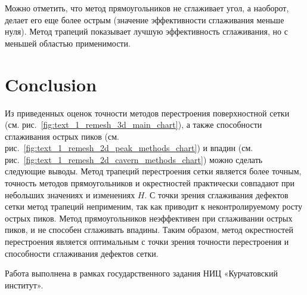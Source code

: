 \documentclass[
11pt,%
tightenlines,%
twoside,%
onecolumn,%
nofloats,%
nobibnotes,%
nofootinbib,%
superscriptaddress,%
noshowpacs,%
centertags]%
{revtex4}
\begin{document}
Можно отметить, что метод прямоугольников не сглаживает угол, а наоборот, делает его еще более острым (значение эффективности сглаживания меньше нуля).
Метод трапеций показывает лучшую эффективность сглаживания, но с меньшей областью применимости.


\section{Conclusion}

Из приведенных оценок точности методов перестроения поверхностной сетки (см. рис.~\ref{fig:text_1_remesh_3d_main_chart}), а также способности сглаживания острых пиков (см. рис.~\ref{fig:text_1_remesh_2d_peak_methods_chart}) и впадин (см. рис.~\ref{fig:text_1_remesh_2d_cavern_methods_chart}) можно сделать следующие выводы.
Метод трапеций перестроения сетки является более точным, точность методов прямоугольников и окрестностей практически совпадают при небольших значениях и изменениях $H$.
С точки зрения сглаживания дефектов сетки метод трапеций неприменим, так как приводит к неконтролируемому росту острых пиков.
Метод прямоугольников неэффективен при сглаживании острых пиков, и не способен сглаживать впадины.
Таким образом, метод окрестностей перестроения является оптимальным с точки зрения точности перестроения и способности сглаживания дефектов сетки.


\begin{acknowledgments}
Работа выполнена в рамках государственного задания НИЦ «Курчатовский институт».
\end{acknowledgments}

%
%
\end{document}
